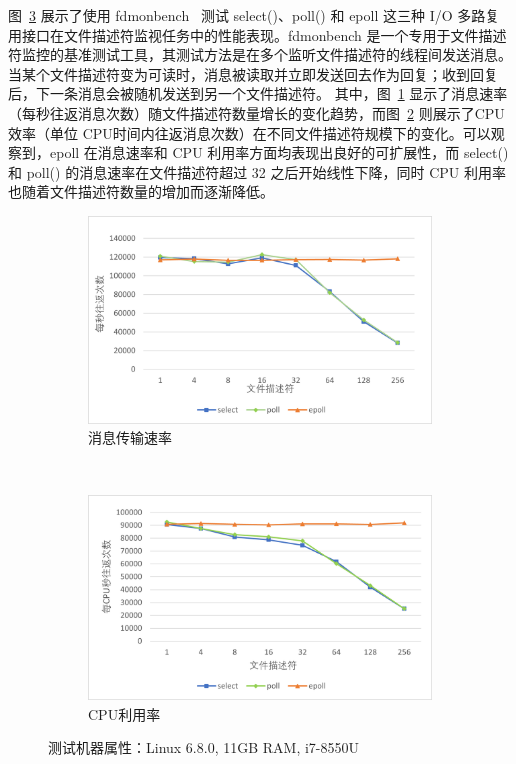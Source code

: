 {\begin{enumerate}[label=\arabic*.]
    图~\ref{fig:io-multiplex-api} 展示了使用 fdmonbench~\citep{githubStefanhafdmonbench} 测试 select()、poll() 和 epoll 这三种 I/O 多路复用接口在文件描述符监视任务中的性能表现。fdmonbench 是一个专用于文件描述符监控的基准测试工具，其测试方法是在多个监听文件描述符的线程间发送消息。当某个文件描述符变为可读时，消息被读取并立即发送回去作为回复；收到回复后，下一条消息会被随机发送到另一个文件描述符。 其中，图~\ref{fig:io-multiplex-perf} 显示了消息速率（每秒往返消息次数）随文件描述符数量增长的变化趋势，而图~\ref{fig:io-multiplex-cpu} 则展示了CPU 效率（单位 CPU时间内往返消息次数）在不同文件描述符规模下的变化。可以观察到，epoll 在消息速率和 CPU 利用率方面均表现出良好的可扩展性，而 select() 和 poll() 的消息速率在文件描述符超过 32 之后开始线性下降，同时 CPU 利用率也随着文件描述符数量的增加而逐渐降低。
    \begin{figure}[!htbp]
    	\centering
    	\begin{subfigure}[b]{0.45\textwidth}
    		\includegraphics[width=\textwidth]{Img/io-multiplex-perf.png}
    		\caption{消息传输速率}
    		\label{fig:io-multiplex-perf}
    	\end{subfigure}
    	~ %
    	\begin{subfigure}[b]{0.45\textwidth}
    		\includegraphics[width=\textwidth]{Img/io-multiplex-cpu.png}
    		\caption{CPU利用率}
    		\label{fig:io-multiplex-cpu}
    	\end{subfigure}
        \caption*{测试机器属性：Linux 6.8.0, 11GB RAM, i7-8550U}
        \label{fig:io-multiplex-api}
    \end{figure}


\end{enumerate}}
